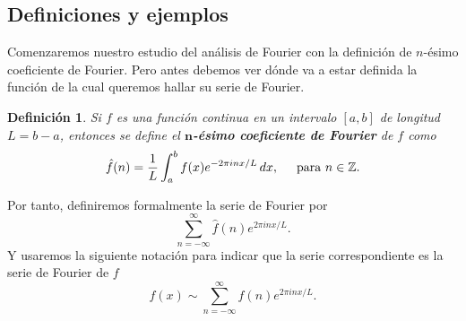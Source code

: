 \documentclass[12pt]{article}
\theoremstyle{plain}
\newtheorem{definicion}[teorema]{\textbf{Definición}}
\theoremstyle{definition}
\numberwithin{equation}{section}
\begin{document}
    \subsection{Definiciones y ejemplos}
        Comenzaremos nuestro estudio del análisis de Fourier con la definición de \(n\)-ésimo coeficiente de Fourier. Pero antes debemos ver dónde va a estar definida la función de la cual queremos hallar su serie de Fourier.
        \begin{definicion}
            Si \(f\) es una función continua en un intervalo \([a,b]\) de longitud \(L = b-a\), entonces se define el \textbf{\(\boldsymbol{n}\)-ésimo coeficiente de Fourier} de \(f\) como
            \begin{equation*}
                \hat{f}(n) = \frac{1}{L} \int_{a}^{b} f(x)e^{-2\pi inx/L} \,dx, \hspace{5mm} \text{para \(n \in \mathbb{Z}\)}.
            \end{equation*}
        \end{definicion}
        Por tanto, definiremos formalmente la serie de Fourier por
        \begin{equation*}
            \sum_{n = -\infty}^{\infty} \hat{f}(n)e^{2\pi inx/L}.
        \end{equation*}
        Y usaremos la siguiente notación para indicar que la serie correspondiente es la serie de Fourier de \(f\)
        \begin{equation*}
            f(x) \sim \sum_{n = -\infty}^{\infty} \hat{f}(n)e^{2\pi inx/L}.
        \end{equation*}
\end{document}
